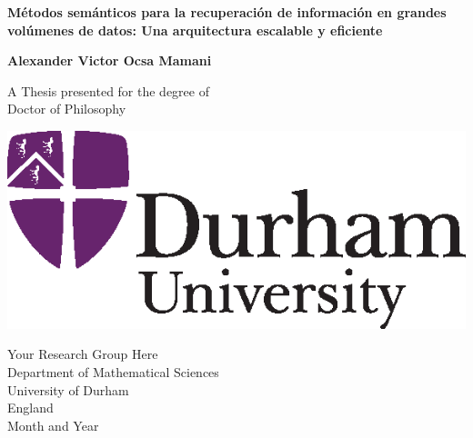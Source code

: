 
\setcounter{page}{1}

\newpage

\thispagestyle{empty}
\begin{center}
  \vspace*{1cm}
 {\Large\bf Métodos semánticos para la recuperación de información en grandes volúmenes de datos: Una arquitectura escalable y eficiente}


  \vspace*{2cm}
  {\Large\bf Alexander Victor Ocsa Mamani}

  \vfill

  {\Large A Thesis presented for the degree of\\
         [1mm] Doctor of Philosophy}
  \vspace*{0.9cm}
  
   \begin{center}
   \includegraphics{DU_2-col_sml.eps}
   \end{center}

  {\large Your Research Group Here\\
          [-3mm] Department of Mathematical Sciences\\
          [-3mm] University of Durham\\
          [-3mm] England\\
          [1mm]  Month and Year}

\end{center}

